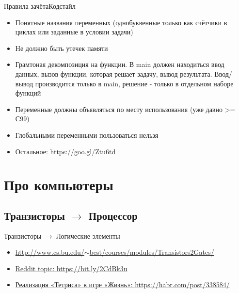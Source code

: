 \documentclass[10pt]{beamer}
\begin{document}
\begin{frame}[fragile]{Правила зачёта}{Кодстайл}
\begin{itemize}
\item Понятные названия переменных (однобуквенные только как счётчики в циклах или заданные в условии задачи)
\item Не должно быть утечек памяти
\item Грамтоная декомпозиция на функции. В main должен находиться ввод данных, вызов функции, которая решает задачу, вывод результата. Ввод/вывод производится только в main, решение - только в отдельном наборе функций
\item Переменные должны объявляться по месту использования (уже давно >= С99)
\item Глобальными переменными пользоваться нельзя
\item Остальное: \href{https://goo.gl/Ztu6td}{https://goo.gl/Ztu6td}
\end{itemize}
\end{frame}

\section{Про компьютеры}
\subsection{Транзисторы $\rightarrow$ Процессор}
\begin{frame}[fragile]{Транзисторы $\rightarrow$ Логические элементы}
\begin{itemize}
\item \href{http://www.cs.bu.edu/~best/courses/modules/Transistors2Gates/}{http://www.cs.bu.edu/$\sim$best/courses/modules/Transistors2Gates/}
\item \href{https://www.reddit.com/r/compsci/comments/209fqx/i_want_to_know_how_the_computer_works_from/}{Reddit topic: https://bit.ly/2CdBk3u}
\item \href{https://habr.com/post/338584/}{Реализация «Тетриса» в игре «Жизнь»: https://habr.com/post/338584/}
\end{itemize}
\end{frame}
\end{document}
